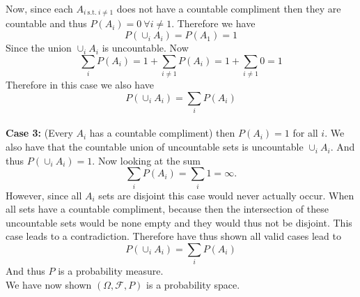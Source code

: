 \documentclass[10pt]{amsart}
\begin{document}
\begin{itemize}
\begin{itemize}
		Now, since each $A_{i \:\text{s.t.}\: i \neq 1}$ does not have a countable compliment then they are countable and thus $P(A_i) = 0 \: \forall i \neq 1$.
		Therefore we have
		$$P(\cup_i A_i) = P(A_1) = 1$$
		Since the union $\cup_i A_i$ is uncountable. Now
		$$ \sum_i P(A_i) = 1 + \sum_{i \neq 1} P(A_i) = 1 + \sum_{i \neq 1} 0 = 1$$
		Therefore in this case we also have
		$$P(\cup_i A_i) = \sum_i P(A_i)$$ \\
		\textbf{Case 3:} (Every $A_i$ has a countable compliment) then $P(A_i) = 1$ for all $i$.
		We also have that the countable union of uncountable sets is uncountable $\cup_i A_i$.
		And thus $P(\cup_i A_i) = 1$.
		Now looking at the sum
		$$\sum_i P(A_i) = \sum_i 1 = \infty.$$
		However, since all $A_i$ sets are disjoint this case would never actually occur. 
		When all sets have a countable compliment, because then the intersection of these uncountable sets would be none empty and they would thus not be disjoint.
		This case leads to a contradiction. 
		Therefore have thus shown all valid cases lead to $$P(\cup_i A_i) = \sum_i P(A_i)$$
		And thus $P$ is a probability measure. \\
		We have now shown $(\Omega, \mathcal{F}, P)$ is a probability space.
	\end{itemize}
\end{itemize}
\end{document}
